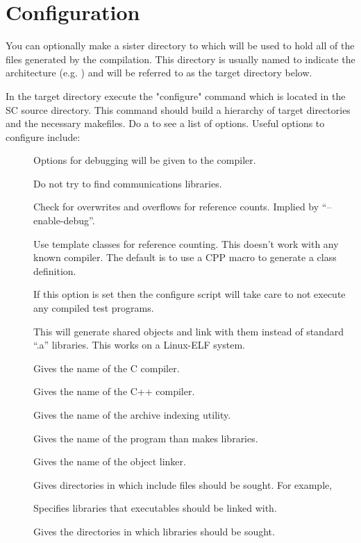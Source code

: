 \section{Configuration}

 You can optionally make a sister directory to  which will be
used to hold all of the files generated by the compilation.  This directory
is usually named to indicate the architecture (e.g. )
and will be referred to as the target directory below.

 In the target directory execute the "configure" command which is located
in the SC source directory. This command should build a hierarchy of
target directories and the necessary makefiles. Do a  to see a list of options.  Useful options to configure
include:

\begin{description}
\item[] Options for debugging will be given to
the compiler.
\item[] Do not try to find communications
libraries.
\item[] Check for overwrites and overflows
for reference counts.  Implied by ``--enable-debug''.
\item[] Use template classes for reference
counting.  This doesn't work with any known compiler.  The default is to
use a CPP macro to generate a class definition.
\item[] If this option is set then the
configure script will take care to not execute any compiled test programs.
\item[] This will generate shared objects and
link with them instead of standard ``.a'' libraries.  This works on a
Linux-ELF system.
\item[] Gives the name of the C compiler.
\item[] Gives the name of the C++ compiler.
\item[] Gives the name of the archive indexing utility.
\item[] Gives the name of the program than makes libraries.
\item[] Gives the name of the object linker.
\item[] Gives directories in which include files
should be sought.  For example, 
\item[] Specifies libraries that executables should be
linked with.
\item[] Gives the directories in which libraries
should be sought.
\end{description}

